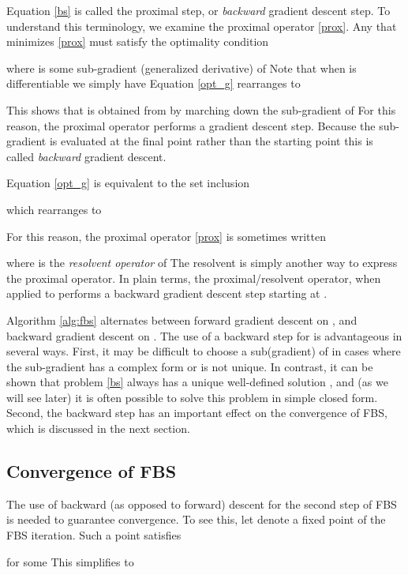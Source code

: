 \documentclass{amsart}
\newcommand{\eqn}[2]{}
\newcommand{\opt}{^\star}
\theoremstyle{definition}
\begin{document}
Equation \eqref{bs} is called the proximal step, or {\em backward} gradient descent step.   To understand this terminology, we examine the proximal operator \eqref{prox}. Any   that minimizes \eqref{prox} must satisfy the optimality condition
   \eqn{opt_g}{
   0=  \tau G+( x\opt - z)
   }
  where   is some sub-gradient (generalized derivative) of  Note that when  is differentiable we simply have  Equation \eqref{opt_g} rearranges to 
   
    This shows that  is obtained from  by marching down the sub-gradient of  For this reason, the proximal operator performs a gradient descent step.  Because the sub-gradient  is evaluated at the final point  rather than the starting point  this is called {\em backward} gradient descent.  
    
    Equation \eqref{opt_g} is equivalent to the set inclusion
    
    which rearranges to 
    
    For this reason, the proximal operator \eqref{prox} is sometimes written 
    
    where  is the {\em resolvent operator} of   The resolvent is simply another way to express the proximal operator. In plain terms, the proximal/resolvent operator, when applied to   performs a backward gradient descent step starting at .
    
    Algorithm \ref{alg:fbs} alternates between forward gradient descent on , and backward gradient descent on .
    The use of a backward step for  is advantageous in several ways. First, it may be difficult to choose a sub(gradient) of  in cases where the sub-gradient  has a complex form or is not unique.  In contrast, it can be shown that problem \eqref{bs} always has a unique well-defined solution \cite{CW05}, and (as we will see later) it is often possible to solve this problem in simple closed form. Second, the backward step has an important effect on the convergence of FBS, which is discussed in the next section.
    
    \subsection{Convergence of FBS}
    The use of backward (as opposed to forward) descent for the second step of FBS is needed to guarantee convergence.  To see this,  let   denote a fixed point of the FBS iteration.  Such a point satisfies
       
    for some   This simplifies to 
    
\end{document}
